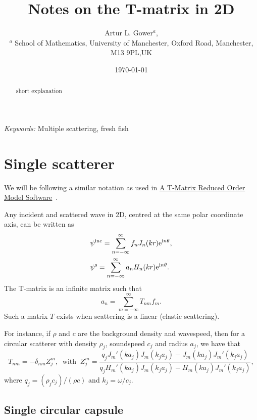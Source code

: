 \documentclass[ 12pt, a4paper]{article}
\begin{document}
\title{Notes on the T-matrix in 2D}
\author{
Artur L. Gower$^{a}$,\\
\footnotesize{$^{a}$ School of Mathematics, University of Manchester, Oxford Road, Manchester, M13 9PL,UK}
}
\date{\today}
\maketitle

\begin{abstract}
short explanation
\end{abstract}

\noindent
{\textit{Keywords:} Multiple scattering, fresh fish}

\section{Single scatterer}

We will be following a similar notation as used in \href{a9-ganesh.pdf}{A T-Matrix Reduced Order
Model Software}~\parencite{ganesh_far-field_2010,ganesh_algorithm_2017}.

Any incident and scattered wave in 2D, centred at the same polar coordinate axis, can be written as
\begin{align}
  & \psi^{\mathrm{inc}} = \sum_{n=-\infty}^\infty f_n J_{n}(k r) \mathrm{e}^{\mathrm{i} n \theta},
  \\
  & \psi^{\mathrm{s}} = \sum_{n=-\infty}^\infty a_n H_{n}(k r) \mathrm{e}^{\mathrm{i} n \theta}.
\end{align}
The T-matrix is an infinite matrix such that
\begin{equation}
  a_n = \sum_{m=-\infty}^\infty T_{nm} f_m.
\end{equation}
Such a matrix $T$ exists when scattering is a linear (elastic scattering).

For instance, if $\rho$ and $c$ are the background density and wavespeed, then for a circular scatterer with density $\rho_j$, soundspeed $c_j$ and radius $a_j$, we have that
\begin{equation}
  T_{nm} = - \delta_{nm} Z^m_j, \;\; \text{with} \;\; Z^m_j = \frac{q_j J_m' (k a_j) J_m (k_j a_j) - J_m (k a_j) J_m' (k_j a_j) }{q_j H_m '(k a_j) J_m(k_j a_j) - H_m(k a_j) J_m '(k_j a_j)},
  \label{eqn:circular_t-matrix}
\end{equation}
where $q_j = (\rho_j c_j)/(\rho c)$ and $k_j = \omega/c_j$.

\subsection{Single circular capsule}
\end{document}
